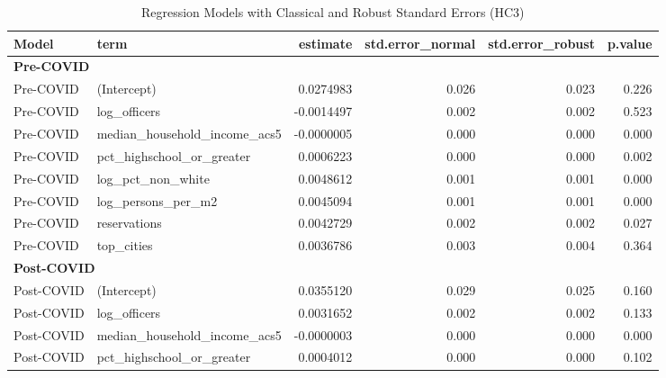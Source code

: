\documentclass[
  11pt,
  letterpaper,
  DIV=11,
  numbers=noendperiod]{scrartcl}
\begin{document}
\begin{table}

\caption{\label{tab:acs5_modeling}Regression Models with Classical and Robust Standard Errors (HC3)}
\centering
\begin{tabular}[t]{l|l|r|r|r|r}
\hline
Model & term & estimate & std.error\_normal & std.error\_robust & p.value\\
\hline
\multicolumn{6}{l}{\textbf{Pre-COVID}}\\
\hline
\hspace{1em}Pre-COVID & (Intercept) & 0.0274983 & 0.026 & 0.023 & 0.226\\
\hline
\hspace{1em}Pre-COVID & log\_officers & -0.0014497 & 0.002 & 0.002 & 0.523\\
\hline
\hspace{1em}Pre-COVID & median\_household\_income\_acs5 & -0.0000005 & 0.000 & 0.000 & 0.000\\
\hline
\hspace{1em}Pre-COVID & pct\_highschool\_or\_greater & 0.0006223 & 0.000 & 0.000 & 0.002\\
\hline
\hspace{1em}Pre-COVID & log\_pct\_non\_white & 0.0048612 & 0.001 & 0.001 & 0.000\\
\hline
\hspace{1em}Pre-COVID & log\_persons\_per\_m2 & 0.0045094 & 0.001 & 0.001 & 0.000\\
\hline
\hspace{1em}Pre-COVID & reservations & 0.0042729 & 0.002 & 0.002 & 0.027\\
\hline
\hspace{1em}Pre-COVID & top\_cities & 0.0036786 & 0.003 & 0.004 & 0.364\\
\hline
\multicolumn{6}{l}{\textbf{Post-COVID}}\\
\hline
\hspace{1em}Post-COVID & (Intercept) & 0.0355120 & 0.029 & 0.025 & 0.160\\
\hline
\hspace{1em}Post-COVID & log\_officers & 0.0031652 & 0.002 & 0.002 & 0.133\\
\hline
\hspace{1em}Post-COVID & median\_household\_income\_acs5 & -0.0000003 & 0.000 & 0.000 & 0.000\\
\hline
\hspace{1em}Post-COVID & pct\_highschool\_or\_greater & 0.0004012 & 0.000 & 0.000 & 0.102\\

\end{tabular}
\end{table}
\end{document}
